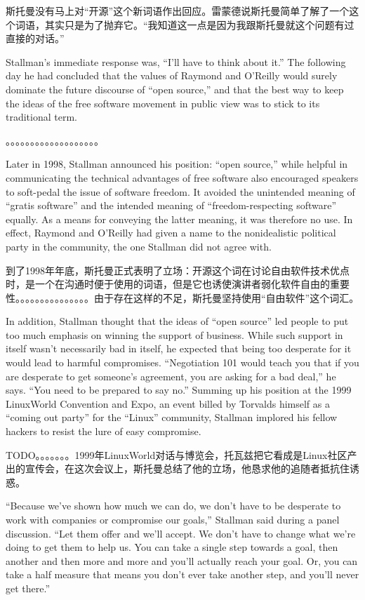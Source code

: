 \ifdefined\chs
斯托曼没有马上对“开源”这个新词语作出回应。雷蒙德说斯托曼简单了解了一个这个词语，其实只是为了抛弃它。“我知道这一点是因为我跟斯托曼就这个问题有过直接的对话。”
\fi

\ifdefined\eng
Stallman's immediate response was, ``I'll have to think about it.''  The following day he had concluded that the values of Raymond and O'Reilly would surely dominate the future discourse of ``open source,'' and that the best way to keep the ideas of the free software movement in public view was to stick to its traditional term.
\fi

\ifdefined\chs
。。。。。。。。。。。。。。。。。。。
\fi

\ifdefined\eng
Later in 1998, Stallman announced his position: ``open source,'' while helpful in communicating the technical advantages of free software also encouraged speakers to soft-pedal the issue of software freedom. It avoided the unintended meaning of ``gratis software'' and the intended meaning of ``freedom-respecting software'' equally.  As a means for conveying the latter meaning, it was therefore no use.  In effect, Raymond and O'Reilly had given a name to the nonidealistic political party in the community, the one Stallman did not agree with.
\fi

\ifdefined\chs
到了1998年年底，斯托曼正式表明了立场：开源这个词在讨论自由软件技术优点时，是一个在沟通时便于使用的词语，但是它也诱使演讲者弱化软件自由的重要性。。。。。。。。。。。。。。。由于存在这样的不足，斯托曼坚持使用“自由软件”这个词汇。
\fi

\ifdefined\eng
In addition, Stallman thought that the ideas of ``open source'' led people to put too much emphasis on winning the support of business.  While such support in itself wasn't necessarily bad in itself, he expected that being too desperate for it would lead to harmful compromises.  ``Negotiation 101 would teach you that if you are desperate to get someone's agreement, you are asking for a bad deal,'' he says.  ``You need to be prepared to say no.''  Summing up his position at the 1999 LinuxWorld Convention and Expo, an event billed by Torvalds himself as a ``coming out party'' for the ``Linux'' community, Stallman implored his fellow hackers to resist the lure of easy compromise.
\fi

\ifdefined\chs
TODO。。。。。。。1999年LinuxWorld对话与博览会，托瓦兹把它看成是Linux社区产出的宣传会，在这次会议上，斯托曼总结了他的立场，他恳求他的追随者抵抗住诱惑。
\fi

\ifdefined\eng
``Because we've shown how much we can do, we don't have to be desperate to work with companies or compromise our goals,'' Stallman said during a panel discussion. ``Let them offer and we'll accept. We don't have to change what we're doing to get them to help us. You can take a single step towards a goal, then another and then more and more and you'll actually reach your goal. Or, you can take a half measure that means you don't ever take another step, and you'll never get there.''
\fi

